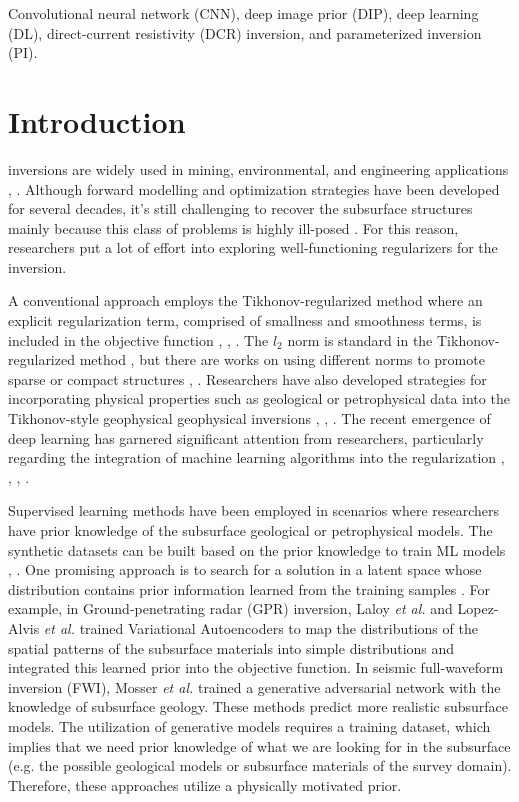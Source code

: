 \documentclass[lettersize,journal]{IEEEtran}
\begin{document}
\begin{IEEEkeywords}
Convolutional neural network (CNN), deep image prior (DIP), deep learning (DL), direct-current resistivity (DCR) inversion, and parameterized inversion (PI).
\end{IEEEkeywords}

\section{Introduction}
\label{sec:1}
 inversions are widely used in mining, environmental, and engineering applications \cite{ref25}, \cite{ref30}. Although forward modelling and optimization strategies have been developed for several decades, it’s still challenging to recover the subsurface structures mainly because this class of problems is highly ill-posed \cite{ref36}. For this reason, researchers put a lot of effort into exploring well-functioning regularizers for the inversion. 

A conventional approach employs the Tikhonov-regularized method where an explicit regularization term, comprised of smallness and smoothness terms, is included in the objective function \cite{ref25}, \cite{ref36}, \cite{ref37}. The $l_2$ norm is standard in the Tikhonov-regularized method \cite{ref5}, but there are works on using different norms to promote sparse or compact structures \cite{ref37}, \cite{ref21}. Researchers have also developed strategies for incorporating physical properties such as geological or petrophysical data into the Tikhonov-style geophysical geophysical inversions \cite{ref37}, \cite{ref33}, \cite{ref34}. The recent emergence of deep learning has garnered significant attention from researchers, particularly regarding the integration of machine learning algorithms into the regularization \cite{ref30}, \cite{ref17}, \cite{ref29}, \cite{ref35}.  

Supervised learning methods have been employed in scenarios where researchers have prior knowledge of the subsurface geological or petrophysical models. The synthetic datasets can be built based on the prior knowledge to train ML models \cite{ref39}, \cite{ref40}. One promising approach is to search for a solution in a latent space whose distribution contains prior information learned from the training samples \cite{ref2}. For example, in Ground-penetrating radar (GPR) inversion, Laloy \textit{et al.} \cite{ref8} and Lopez-Alvis \textit{et al.} \cite{ref11} trained Variational Autoencoders to map the distributions of the spatial patterns of the subsurface materials into simple distributions and integrated this learned prior into the objective function. In seismic full-waveform inversion (FWI), Mosser \textit{et al.} \cite{ref12} trained a generative adversarial network with the knowledge of subsurface geology. These methods predict more realistic subsurface models. The utilization of generative models requires a training dataset, which implies that we need prior knowledge of what we are looking for in the subsurface (e.g. the possible geological models or subsurface materials of the survey domain). Therefore, these approaches utilize a physically motivated prior.
\end{document}

